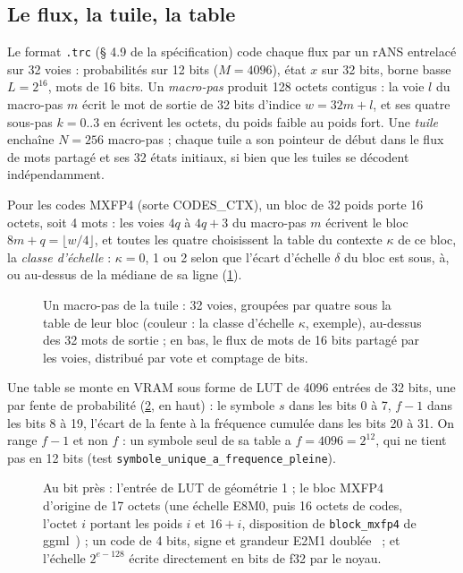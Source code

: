 \subsection{Le flux, la tuile, la table}

Le format \texttt{.trc} (§ 4.9 de la spécification) code chaque flux par un rANS entrelacé sur 32 voies : probabilités sur 12 bits ($M = \num{4096}$), état $x$ sur 32 bits, borne basse $L = 2^{16}$, mots de 16 bits. Un \emph{macro-pas} produit 128 octets contigus : la voie $l$ du macro-pas $m$ écrit le mot de sortie de 32 bits d'indice $w = 32m + l$, et ses quatre sous-pas $k = 0..3$ en écrivent les octets, du poids faible au poids fort. Une \emph{tuile} enchaîne $N = 256$ macro-pas ; chaque tuile a son pointeur de début dans le flux de mots partagé et ses 32 états initiaux, si bien que les tuiles se décodent indépendamment.

Pour les codes MXFP4 (sorte CODES\_CTX), un bloc de 32 poids porte 16 octets, soit 4 mots : les voies $4q$ à $4q+3$ du macro-pas $m$ écrivent le bloc $8m + q = \lfloor w/4 \rfloor$, et toutes les quatre choisissent la table du contexte $\kappa$ de ce bloc, la \emph{classe d'échelle} : $\kappa = 0$, 1 ou 2 selon que l'écart d'échelle $\delta$ du bloc est sous, à, ou au-dessus de la médiane de sa ligne (\cref{fig:t2n-tuile}).

\begin{figure}[!htbp]
\centering
\resizebox{\linewidth}{!}{\SchemaNoyTuile}
\caption[La tuile rANS et la table par voie]{Un macro-pas de la tuile : 32 voies, groupées par quatre sous la table de leur bloc (couleur : la classe d'échelle $\kappa$, exemple), au-dessus des 32 mots de sortie ; en bas, le flux de mots de 16 bits partagé par les voies, distribué par vote et comptage de bits.}
\label{fig:t2n-tuile}
\end{figure}

Une table se monte en VRAM sous forme de LUT de \num{4096} entrées de 32 bits, une par fente de probabilité (\cref{fig:t2n-bits}, en haut) : le symbole $s$ dans les bits 0 à 7, $f - 1$ dans les bits 8 à 19, l'écart de la fente à la fréquence cumulée dans les bits 20 à 31. On range $f - 1$ et non $f$ : un symbole seul de sa table a $f = \num{4096} = 2^{12}$, qui ne tient pas en 12 bits (test \texttt{symbole\_\allowbreak unique\_\allowbreak a\_\allowbreak frequence\_\allowbreak pleine}).

\begin{figure}[!htbp]
\centering
\resizebox{\linewidth}{!}{\SchemaNoyBits}
\caption[Les bits : entrée de LUT, bloc MXFP4, code, échelle E8M0]{Au bit près : l'entrée de LUT de géométrie 1 ; le bloc MXFP4 d'origine de 17 octets (une échelle E8M0, puis 16 octets de codes, l'octet $i$ portant les poids $i$ et $16 + i$, disposition de \texttt{block\_mxfp4} de ggml~\cite{ggml2026mxfp4}) ; un code de 4 bits, signe et grandeur E2M1 doublée~\cite{ocpmx2023} ; et l'échelle $2^{e-128}$ écrite directement en bits de f32 par le noyau.}
\label{fig:t2n-bits}
\end{figure}

